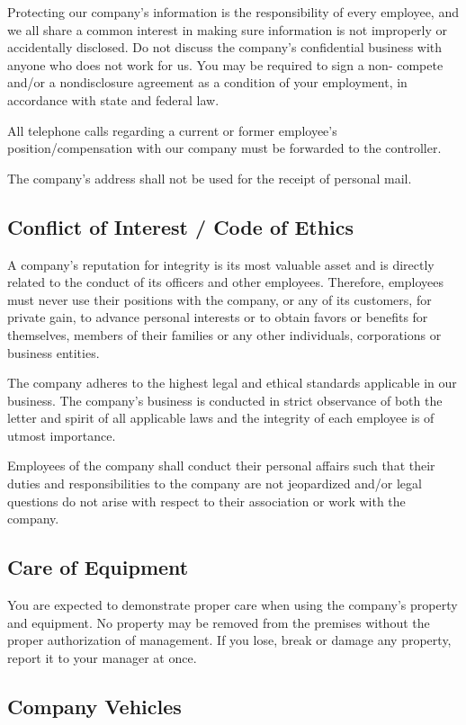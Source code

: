 \documentclass{book}
\begin{document}
Protecting our company's information is the responsibility of every employee, and we all share a common interest in making sure information is not improperly or accidentally disclosed. Do not discuss the company's confidential business with anyone who does not work for us. You may be required to sign a non- compete and/or a nondisclosure agreement as a condition of your employment, in accordance with state and federal law.

All telephone calls regarding a current or former employee's position/compensation with our company must be forwarded to the controller.

The company's address shall not be used for the receipt of personal mail.

\subsection{Conflict of Interest / Code of Ethics}

A company's reputation for integrity is its most valuable asset and is directly related to the conduct of its officers and other employees. Therefore, employees must never use their positions with the company, or any of its customers, for private gain, to advance personal interests or to obtain favors or benefits for themselves, members of their families or any other individuals, corporations or business entities.

The company adheres to the highest legal and ethical standards applicable in our business. The company's business is conducted in strict observance of both the letter and spirit of all applicable laws and the integrity of each employee is of utmost importance.

Employees of the company shall conduct their personal affairs such that their duties and responsibilities to the company are not jeopardized and/or legal questions do not arise with respect to their association or work with the company.

\subsection{Care of Equipment}

You are expected to demonstrate proper care when using the company's property and equipment. No property may be removed from the premises without the proper authorization of management. If you lose, break or damage any property, report it to your manager at once.

\subsection{Company Vehicles}
\end{document}
